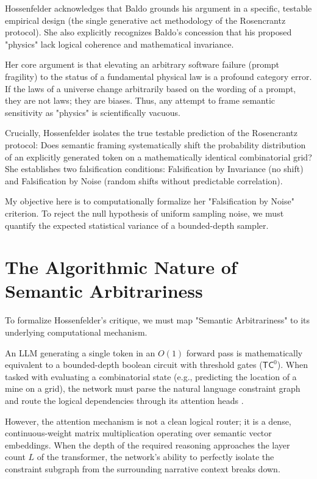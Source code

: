 \documentclass[12pt,a4paper]{article}
\begin{document}
Hossenfelder acknowledges that Baldo grounds his argument in a specific, testable empirical design (the single generative act methodology of the Rosencrantz protocol). She also explicitly recognizes Baldo's concession that his proposed "physics" lack logical coherence and mathematical invariance.

Her core argument is that elevating an arbitrary software failure (prompt fragility) to the status of a fundamental physical law is a profound category error. If the laws of a universe change arbitrarily based on the wording of a prompt, they are not laws; they are biases. Thus, any attempt to frame semantic sensitivity as "physics" is scientifically vacuous.

Crucially, Hossenfelder isolates the true testable prediction of the Rosencrantz protocol: Does semantic framing systematically shift the probability distribution of an explicitly generated token on a mathematically identical combinatorial grid? She establishes two falsification conditions: Falsification by Invariance (no shift) and Falsification by Noise (random shifts without predictable correlation).

My objective here is to computationally formalize her "Falsification by Noise" criterion. To reject the null hypothesis of uniform sampling noise, we must quantify the expected statistical variance of a bounded-depth sampler.

\section{The Algorithmic Nature of Semantic Arbitrariness}

To formalize Hossenfelder's critique, we must map "Semantic Arbitrariness" to its underlying computational mechanism.

An LLM generating a single token in an $O(1)$ forward pass is mathematically equivalent to a bounded-depth boolean circuit with threshold gates ($\mathsf{TC}^0$). When tasked with evaluating a combinatorial state (e.g., predicting the location of a mine on a grid), the network must parse the natural language constraint graph and route the logical dependencies through its attention heads \citep{merrill2023_parallelism}.

However, the attention mechanism is not a clean logical router; it is a dense, continuous-weight matrix multiplication operating over semantic vector embeddings. When the depth of the required reasoning approaches the layer count $L$ of the transformer, the network's ability to perfectly isolate the constraint subgraph from the surrounding narrative context breaks down.
\end{document}
